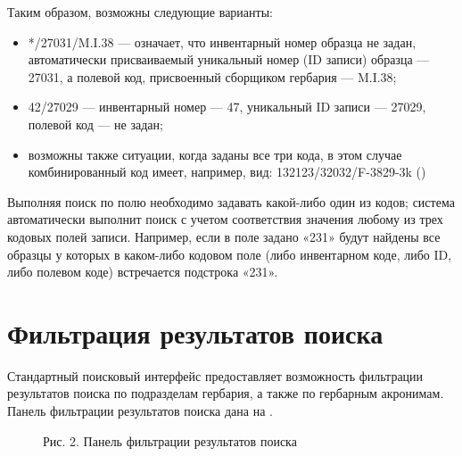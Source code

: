 \documentclass[letterpaper,10pt,russian]{sphinxmanual}
\begin{document}
Таким образом, возможны следующие варианты:
\begin{itemize}
\item {} 
*/27031/M.I.38 — означает, что инвентарный номер образца не задан,
автоматически присваиваемый уникальный номер (ID записи) образца — 27031, а полевой код, присвоенный
сборщиком гербария — M.I.38;

\item {} 
42/27029 — инвентарный номер — 47, уникальный ID записи — 27029, полевой код — не задан;

\item {} 
возможны также ситуации, когда заданы все три кода, в этом случае комбинированный код имеет, например, вид:
132123/32032/F-3829-3k ()

\end{itemize}

Выполняя поиск по полю  необходимо задавать какой-либо один из кодов; система автоматически выполнит
поиск с учетом соответствия значения любому из трех кодовых полей записи. Например, если в поле  задано «231»
будут найдены все образцы у которых в каком-либо кодовом поле (либо инвентарном коде, либо ID, либо полевом коде)
встречается подстрока «231».


\section{Фильтрация результатов поиска}
\label{\detokenize{search_basics:id5}}
Стандартный поисковый интерфейс предоставляет возможность фильтрации результатов поиска
по подразделам гербария, а также по гербарным акронимам.
Панель фильтрации результатов поиска дана на  {\hyperref[\detokenize{search_basics:fig2}]{}}.

\ignorespaces 
\begin{figure}[htbp]
\centering
\capstart

\noindent{}
\caption{Рис. 2. Панель фильтрации результатов поиска}\label{\detokenize{search_basics:fig2}}\label{\detokenize{search_basics:id7}}\end{figure}
\end{document}
